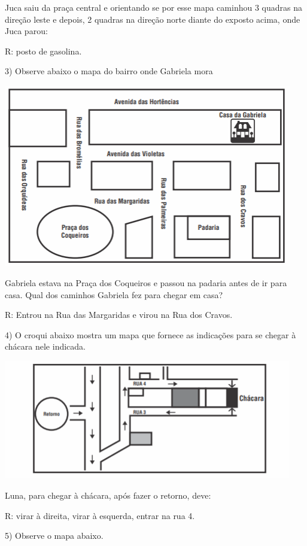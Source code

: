 Juca saiu da praça central e orientando se por esse mapa caminhou 3
quadras na direção leste e depois, 2 quadras na direção norte diante do
exposto acima, onde Juca parou:

R: posto de gasolina.

3) Observe abaixo o mapa do bairro onde Gabriela mora

\includegraphics[width=4.95347in,height=3.13958in]{./imgSAEB_6_MAT/media/image66.png}

Gabriela estava na Praça dos Coqueiros e passou na padaria antes de ir
para casa. Qual dos caminhos Gabriela fez para chegar em casa?

R: Entrou na Rua das Margaridas e virou na Rua dos Cravos.

4) O croqui abaixo mostra um mapa que fornece as indicações para se
chegar à chácara nele indicada.

\includegraphics[width=4.95347in,height=2.04653in]{./imgSAEB_6_MAT/media/image67.png}

Luna, para chegar à chácara, após fazer o retorno, deve:

R: virar à direita, virar à esquerda, entrar na rua 4.

5) Observe o mapa abaixo.

